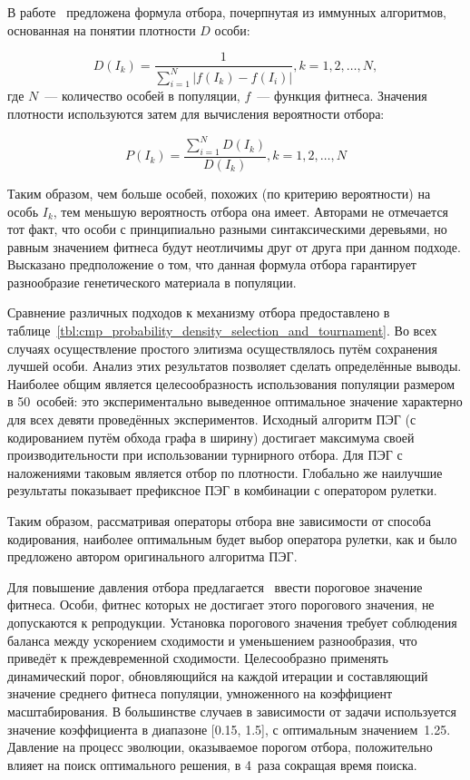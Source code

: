 В работе~\cite{conf/icnc/PengTZY05} предложена формула отбора, почерпнутая из иммунных алгоритмов, основанная на понятии плотности $D$ особи:

\begin{equation}
\label{eq:EAOGE_density}
D(I_k) = \frac{1}{\sum\limits_{i=1}^N{|f(I_k) - f(I_i)|}}, k=1,2,\ldots,N,
\end{equation}
где $N$~--- количество особей в популяции, $f$~--- функция фитнеса. Значения плотности используются затем для вычисления вероятности отбора:

\begin{equation}
\label{eq:EAOGE_probability}
P(I_k) = \frac{\sum\limits_{i=1}^N{D(I_k)}}{D(I_k)}, k=1,2,\ldots,N
\end{equation}

Таким образом, чем больше особей, похожих (по критерию вероятности) на особь $I_k$, тем меньшую вероятность отбора она имеет. Авторами не отмечается тот факт, что особи с принципиально разными синтаксическими деревьями, но равным значением фитнеса будут неотличимы друг от друга при данном подходе. Высказано предположение о том, что данная формула отбора гарантирует разнообразие генетического материала в популяции.

Сравнение различных подходов к механизму отбора предоставлено в таблице~\ref{tbl:cmp_probability_density_selection_and_tournament}. Во всех случаях осуществление простого элитизма осуществлялось путём сохранения лучшей особи. Анализ этих результатов позволяет сделать определённые выводы. Наиболее общим является целесообразность использования популяции размером в 50~особей: это экспериментально выведенное оптимальное значение характерно для всех девяти проведённых экспериментов. Исходный алгоритм ПЭГ (с кодированием путём обхода графа в ширину) достигает максимума своей производительности при использовании турнирного отбора. Для ПЭГ с наложениями таковым является отбор по плотности. Глобально же наилучшие результаты показывает префиксное ПЭГ в комбинации с оператором рулетки.

Таким образом, рассматривая операторы отбора вне зависимости от способа кодирования, наиболее оптимальным будет выбор оператора рулетки, как и было предложено автором оригинального алгоритма ПЭГ.



Для повышение давления отбора предлагается~\cite{2008acat.confE.66T} ввести пороговое значение фитнеса. Особи, фитнес которых не достигает этого порогового значения, не допускаются к репродукции. Установка порогового значения требует соблюдения баланса между ускорением сходимости и уменьшением разнообразия, что приведёт к преждевременной сходимости. Целесообразно применять динамический порог, обновляющийся на каждой итерации и составляющий значение среднего фитнеса популяции, умноженного на коэффициент масштабирования. В большинстве случаев в зависимости от задачи используется значение коэффициента в диапазоне [0.15, 1.5], с оптимальным значением~1.25. Давление на процесс эволюции, оказываемое порогом отбора, положительно влияет на поиск оптимального решения, в 4~раза сокращая время поиска.

